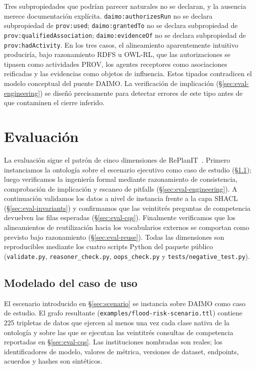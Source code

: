 \documentclass[11pt,a4paper]{article}
\newcommand{\code}[1]{\texttt{#1}}
\begin{document}
Tres subpropiedades que podrían parecer naturales no se declaran, y la ausencia merece documentación explícita. \code{daimo:authorizesRun} no se declara subpropiedad de \code{prov:used}; \code{daimo:grantedTo} no se declara subpropiedad de \code{prov:qualifiedAssociation}; \code{daimo:evidenceOf} no se declara subpropiedad de \code{prov:hadActivity}. En los tres casos, el alineamiento aparentemente intuitivo produciría, bajo razonamiento RDFS u OWL-RL, que las autorizaciones se tipasen como actividades PROV, los agentes receptores como asociaciones reificadas y las evidencias como objetos de influencia. Estos tipados contradicen el modelo conceptual del puente DAIMO. La verificación de implicación (§\ref{sec:eval-engineering}) se diseñó precisamente para detectar errores de este tipo antes de que contaminen el cierre inferido.

\section{Evaluación}\label{sec:eval}

La evaluación sigue el patrón de cinco dimensiones de RePlanIT~\cite{kurteva}. Primero instanciamos la ontología sobre el escenario ejecutivo como caso de estudio (§\ref{sec:eval-usecase}); luego verificamos la ingeniería formal mediante razonamiento de consistencia, comprobación de implicación y escaneo de pitfalls (§\ref{sec:eval-engineering}). A continuación validamos los datos a nivel de instancia frente a la capa SHACL (§\ref{sec:eval-invariants}) y confirmamos que las veintitrés preguntas de competencia devuelven las filas esperadas (§\ref{sec:eval-cqs}). Finalmente verificamos que los alineamientos de reutilización hacia los vocabularios externos se comportan como previsto bajo razonamiento (§\ref{sec:eval-reuse}). Todas las dimensiones son reproducibles mediante los cuatro scripts Python del paquete público (\code{validate.py}, \code{reasoner\_check.py}, \code{oops\_check.py} y \code{tests/negative\_test.py}).

\subsection{Modelado del caso de uso}\label{sec:eval-usecase}

El escenario introducido en §\ref{sec:scenario} se instancia sobre DAIMO como caso de estudio. El grafo resultante (\code{examples/flood-risk-scenario.ttl}) contiene 225 tripletas de datos que ejercen al menos una vez cada clase nativa de la ontología y sobre las que se ejecutan las veintitrés consultas de competencia reportadas en §\ref{sec:eval-cqs}. Las instituciones nombradas son reales; los identificadores de modelo, valores de métrica, versiones de dataset, endpoints, acuerdos y hashes son sintéticos.
\end{document}
